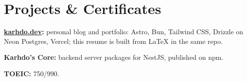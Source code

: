 \documentclass[10pt]{article}
\newcommand{\skill}[2]{\textbf{#1:} #2\par\vspace{1.5pt}}
\begin{document}
\section{Projects \& Certificates}
\skill{\href{https://karhdo.dev}{karhdo.dev}}{personal blog and portfolio: Astro, Bun, Tailwind CSS, Drizzle on Neon Postgres, Vercel; this resume is built from LaTeX in the same repo.}
\skill{Karhdo's Core}{backend server packages for NestJS, published on npm.}
\skill{TOEIC}{750/990.}
\end{document}
